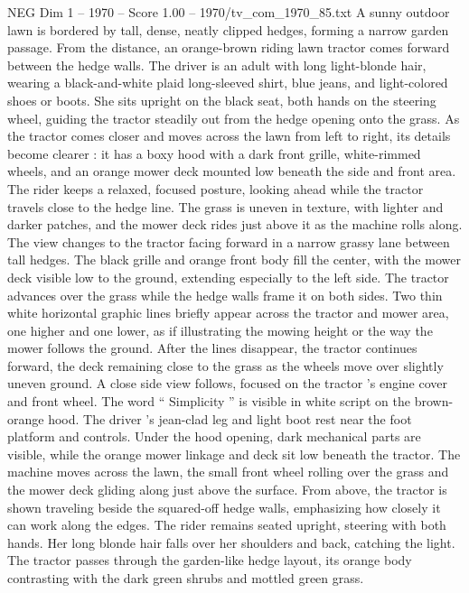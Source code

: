 \begin{textsample}{NEG Dim 1 – 1970 – Score 1.00 – 1970/tv\_com\_1970\_85.txt}  \label{ex:f1_neg_038}
A sunny outdoor lawn is bordered by tall, dense, neatly clipped hedges, forming a narrow garden passage.
From the distance, an orange-brown riding lawn tractor comes forward between the hedge walls.
The driver is an adult with long light-blonde hair, wearing a black-and-white plaid long-sleeved shirt, blue jeans, and light-colored shoes or boots.
She sits upright on the black seat, both hands on the steering wheel, guiding the tractor steadily out from the hedge opening onto the grass.
As the tractor comes closer and moves across the lawn from left to right, its details become clearer : it has a boxy hood with a dark front grille, white-rimmed wheels, and an orange mower deck mounted low beneath the side and front area.
The rider keeps a relaxed, focused posture, looking ahead while the tractor travels close to the hedge line.
The grass is uneven in texture, with lighter and darker patches, and the mower deck rides just above it as the machine rolls along.
The view changes to the tractor facing forward in a narrow grassy lane between tall hedges.
The black grille and orange front body fill the center, with the mower deck visible low to the ground, extending especially to the left side.
The tractor advances over the grass while the hedge walls frame it on both sides.
Two thin white horizontal graphic lines briefly appear across the tractor and mower area, one higher and one lower, as if illustrating the mowing height or the way the mower follows the ground.
After the lines disappear, the tractor continues forward, the deck remaining close to the grass as the wheels move over slightly uneven ground.
A close side view follows, focused on the tractor ’s engine cover and front wheel.
The word “ Simplicity ” is visible in white script on the brown-orange hood.
The driver ’s jean-clad leg and light boot rest near the foot platform and controls.
Under the hood opening, dark mechanical parts are visible, while the orange mower linkage and deck sit low beneath the tractor.
The machine moves across the lawn, the small front wheel rolling over the grass and the mower deck gliding along just above the surface.
From above, the tractor is shown traveling beside the squared-off hedge walls, emphasizing how closely it can work along the edges.
The rider remains seated upright, steering with both hands.
Her long blonde hair falls over her shoulders and back, catching the light.
The tractor passes through the garden-like hedge layout, its orange body contrasting with the dark green shrubs and mottled green grass.

\end{textsample}
